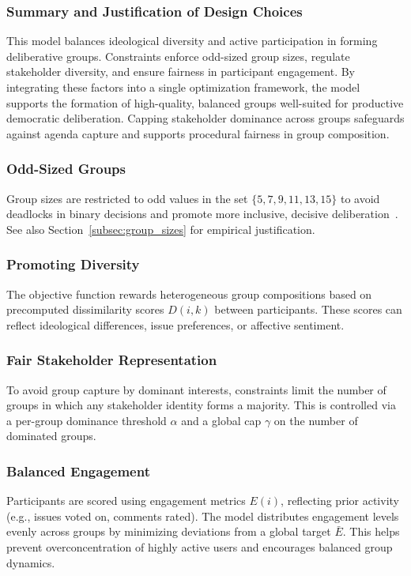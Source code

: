\subsubsection*{Summary and Justification of Design Choices}

This model balances ideological diversity and active participation in forming deliberative groups.
Constraints enforce odd-sized group sizes, regulate stakeholder diversity, and ensure fairness in participant engagement.
By integrating these factors into a single optimization framework, the model supports the formation of high-quality,
balanced groups well-suited for productive democratic deliberation.
Capping stakeholder dominance across groups safeguards against agenda capture
and supports procedural fairness in group composition.

\subsubsection*{Odd-Sized Groups}
Group sizes are restricted to odd values in the set $\{5,7,9,11,13,15\}$ to avoid deadlocks in binary decisions
and promote more inclusive, decisive deliberation~\parencite{menon2011oddgroups}.
See also Section~\ref{subsec:group_sizes} for empirical justification.

\subsubsection*{Promoting Diversity}
The objective function rewards heterogeneous group compositions based on precomputed dissimilarity scores $D(i,k)$
between participants. These scores can reflect ideological differences, issue preferences, or affective sentiment.

\subsubsection*{Fair Stakeholder Representation}
To avoid group capture by dominant interests, constraints limit the number of groups
in which any stakeholder identity forms a majority. This is controlled via a per-group dominance threshold $\alpha$
and a global cap $\gamma$ on the number of dominated groups.

\subsubsection*{Balanced Engagement}
Participants are scored using engagement metrics $E(i)$, reflecting prior activity (e.g., issues voted on, comments rated).
The model distributes engagement levels evenly across groups by minimizing deviations from a global target $\bar{E}$.
This helps prevent overconcentration of highly active users and encourages balanced group dynamics.


